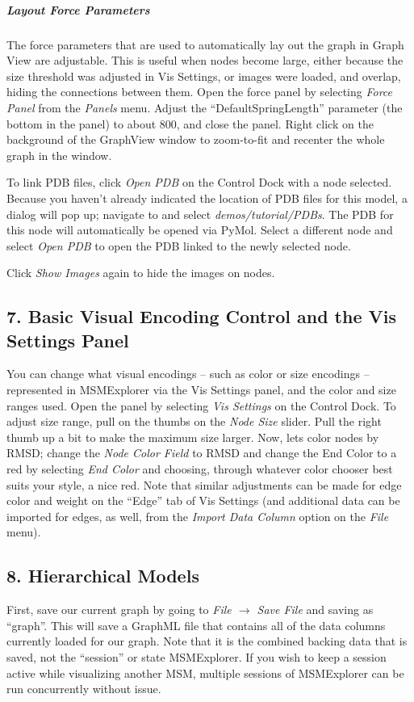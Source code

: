 \documentclass[10pt,a4paper]{report}
\begin{document}
\subparagraph*{Layout Force Parameters}
The force parameters that are used to automatically lay out the graph in Graph View are adjustable. This is useful when nodes become large, either because the size threshold was adjusted in Vis Settings, or images were loaded, and overlap, hiding the connections between them. Open the force panel by selecting \emph{Force Panel} from the \emph{Panels} menu. Adjust the ``DefaultSpringLength'' parameter (the bottom in the panel) to about 800, and close the panel. Right click on the background of the GraphView window to zoom-to-fit and recenter the whole graph in the window. 

To link PDB files, click \emph{Open PDB} on the Control Dock with a node selected. Because you haven't already indicated the location of PDB files for this model, a dialog will pop up; navigate to and select \emph{demos/tutorial/PDBs}. The PDB for this node will automatically be opened via PyMol. Select a different node and select \emph{Open PDB} to open the PDB linked to the newly selected node.

Click \emph{Show Images} again to hide the images on nodes. 

\subsection*{7. Basic Visual Encoding Control and the Vis Settings Panel}
You can change what visual encodings -- such as color or size encodings -- represented in MSMExplorer via the Vis Settings panel, and the color and size ranges used. Open the panel by selecting \emph{Vis Settings} on the Control Dock. To adjust size range, pull on the thumbs on the \emph{Node Size} slider. Pull the right thumb up a bit to make the maximum size larger. Now, lets color nodes by RMSD; change the \emph{Node Color Field} to RMSD and change the End Color to a red by selecting \emph{End Color} and choosing, through whatever color chooser best suits your style, a nice red. Note that similar adjustments can be made for edge color and weight on the ``Edge'' tab of Vis Settings (and additional data can be imported for edges, as well, from the \emph{Import Data Column} option on the \emph{File} menu).

\subsection*{8. Hierarchical Models}
First, save our current graph by going to \emph{File $\rightarrow$ Save File} and saving as ``graph''. This will save a GraphML file that contains all of the data columns currently loaded for our graph. Note that it is the combined backing data that is saved, not the ``session'' or state MSMExplorer. If you wish to keep a session active while visualizing another MSM, multiple sessions of MSMExplorer can be run concurrently without issue. 
\end{document}
